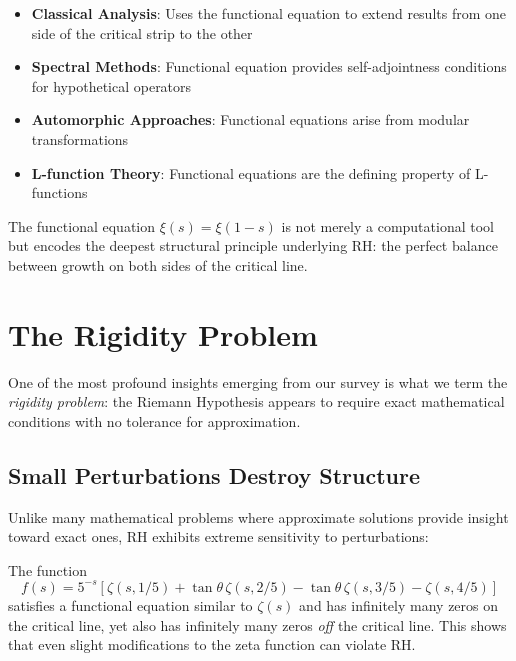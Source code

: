 \begin{itemize}
\item \textbf{Classical Analysis}: Uses the functional equation to extend results from one side of the critical strip to the other
\item \textbf{Spectral Methods}: Functional equation provides self-adjointness conditions for hypothetical operators  
\item \textbf{Automorphic Approaches}: Functional equations arise from modular transformations
\item \textbf{L-function Theory}: Functional equations are the defining property of L-functions
\end{itemize}

The functional equation $\xi(s) = \xi(1-s)$ is not merely a computational tool but encodes the deepest structural principle underlying RH: the perfect balance between growth on both sides of the critical line.

\section{The Rigidity Problem}
\label{sec:rigidity}

One of the most profound insights emerging from our survey is what we term the \emph{rigidity problem}: the Riemann Hypothesis appears to require exact mathematical conditions with no tolerance for approximation.

\subsection{Small Perturbations Destroy Structure}
\label{subsec:perturbations}

Unlike many mathematical problems where approximate solutions provide insight toward exact ones, RH exhibits extreme sensitivity to perturbations:

\begin{example}
The function \cite{davenpoertheilbronn1936}
\begin{equation}
f(s) = 5^{-s}[\zeta(s,1/5) + \tan\theta\,\zeta(s,2/5) - \tan\theta\,\zeta(s,3/5) - \zeta(s,4/5)]
\end{equation}
satisfies a functional equation similar to $\zeta(s)$ and has infinitely many zeros on the critical line, yet also has infinitely many zeros \emph{off} the critical line. This shows that even slight modifications to the zeta function can violate RH.
\end{example}

